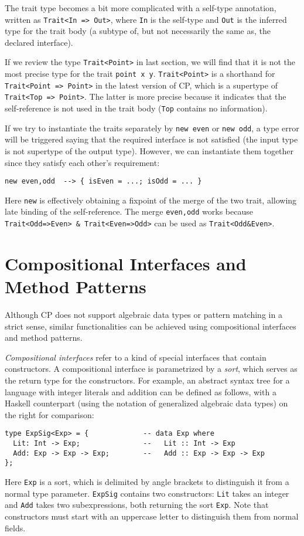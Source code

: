 The trait type becomes a bit more complicated with a self-type annotation,
written as \lstinline{Trait<In => Out>}, where \lstinline{In} is the self-type
and \lstinline{Out} is the inferred type for the trait body (a subtype of, but
not necessarily the same as, the declared interface).

\begin{tipblock}
If we review the type \lstinline{Trait<Point>} in last section, we will find
that it is not the most precise type for the trait \lstinline{point x y}.
\lstinline{Trait<Point>} is a shorthand for \lstinline{Trait<Point => Point>} in
the latest version of CP, which is a supertype of \lstinline{Trait<Top => Point>}.
The latter is more precise because it indicates that the self-reference is not
used in the trait body (\lstinline{Top} contains no information).
\end{tipblock}

\noindent
If we try to instantiate the traits separately by \lstinline{new even} or
\lstinline{new odd}, a type error will be triggered saying that the required
interface is not satisfied (the input type is not supertype of the output type).
However, we can instantiate them together since they satisfy each other's
requirement:
\begin{lstlisting}
new even,odd  --> { isEven = ...; isOdd = ... }
\end{lstlisting}
Here \lstinline{new} is effectively obtaining a fixpoint of the merge of the two
trait, allowing late binding of the self-reference. The merge
\lstinline{even,odd} works because \lstinline{Trait<Odd=>Even> & Trait<Even=>Odd>}
can be used as \lstinline{Trait<Odd&Even>}.

\section{Compositional Interfaces and Method Patterns}

Although CP does not support algebraic data types or pattern matching in a
strict sense, similar functionalities can be achieved using compositional
interfaces and method patterns.

\emph{Compositional interfaces} refer to a kind of special interfaces that
contain constructors. A compositional interface is parametrized by a
\emph{sort}, which serves as the return type for the constructors. For example,
an abstract syntax tree for a language with integer literals and addition can be
defined as follows, with a Haskell counterpart (using the notation of
generalized algebraic data types) on the right for comparison:
\begin{lstlisting}
type ExpSig<Exp> = {             -- data Exp where
  Lit: Int -> Exp;               --   Lit :: Int -> Exp
  Add: Exp -> Exp -> Exp;        --   Add :: Exp -> Exp -> Exp
};
\end{lstlisting}
Here \lstinline{Exp} is a sort, which is delimited by angle brackets to
distinguish it from a normal type parameter. \lstinline{ExpSig} contains two
constructors: \lstinline{Lit} takes an integer and \lstinline{Add} takes two
subexpressions, both returning the sort \lstinline{Exp}. Note that constructors
must start with an uppercase letter to distinguish them from normal fields.

